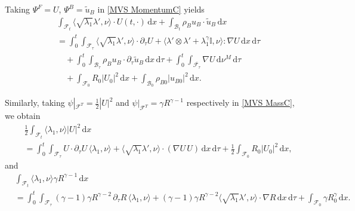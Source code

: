 \documentclass[11pt,twoside,reqno]{amsart}
\numberwithin{equation}{section}
\numberwithin{figure}{section}
\begin{document}
Taking \(\Psi^F=U\), \(\Psi^B=\tilde u_B\) in \eqref{MVS MomentumC} yields
\begin{equation}\label{testby U}
\begin{aligned}
&\int_{\mathcal{F}_t}\Big\langle\sqrt{\lambda_1}\lambda',\nu\Big\rangle\!\cdot U(t,\cdot)\,\mathrm{d}x
+\int_{\mathcal{B}_t}\rho_B u_B\cdot \tilde u_B\,\mathrm{d}x
\\&=\int_0^t\!\!\int_{\mathcal{F}_\tau}
  \Big\langle\sqrt{\lambda_1}\lambda',\nu\Big\rangle\!\cdot \partial_\tau U
 +\Big\langle\lambda'\!\otimes\!\lambda'+\lambda_1^\gamma \mathbb{I},\nu\Big\rangle\!:\!\nabla U\,\mathrm{d}x\,\mathrm{d}\tau\\
&\quad+\int_0^t\!\!\int_{\mathcal{B}_\tau}\rho_B u_B\cdot \partial_\tau \tilde u_B\,\mathrm{d}x\,\mathrm{d}\tau
+\int_0^t\!\!\int_{\overline{\mathcal{F}_\tau}}\nabla U\,\mathrm{d}\nu^M\,\mathrm{d}\tau\\
&\quad+\int_{\mathcal{F}_0}R_0|U_0|^2\,\mathrm{d}x
+\int_{\mathcal{B}_0}\rho_{B0}|u_{B0}|^2\,\mathrm{d}x.
\end{aligned}
\end{equation}

Similarly, taking \(\psi|_{\mathcal{F}^T}=\frac{1}{2}|U|^2\) and \(\psi|_{\mathcal{F}^T}=\gamma R^{\gamma-1}\) respectively in \eqref{MVS MassC}, we obtain
\begin{equation}\label{textby UU}
\begin{aligned}
&\frac{1}{2}\int_{\mathcal{F}_t}\langle \lambda_1,\nu\rangle |U|^2\,\mathrm{d}x
\\&=\int_0^t\!\!\int_{\mathcal{F}_\tau}
 U\cdot \partial_\tau U\,\langle \lambda_1,\nu\rangle
 +\Big\langle \sqrt{\lambda_1}\lambda',\nu\Big\rangle\!\cdot(\nabla U\,U)\,\mathrm{d}x\,\mathrm{d}\tau
 +\frac{1}{2}\int_{\mathcal{F}_0}R_0|U_0|^2\,\mathrm{d}x,
\end{aligned}
\end{equation}
and
\begin{equation}\label{testby R power}
\begin{aligned}
&\int_{\mathcal{F}_t}\langle \lambda_1,\nu\rangle \gamma R^{\gamma-1}\,\mathrm{d}x
\\&=\int_0^t\!\!\int_{\mathcal{F}_\tau}
 (\gamma-1)\gamma R^{\gamma-2}\,\partial_\tau R\,\langle \lambda_1,\nu\rangle
 +(\gamma-1)\gamma R^{\gamma-2}\Big\langle \sqrt{\lambda_1}\lambda',\nu\Big\rangle\!\cdot\nabla R\,\mathrm{d}x\,\mathrm{d}\tau+\int_{\mathcal{F}_0}\gamma R_0^\gamma\,\mathrm{d}x.
\end{aligned}
\end{equation}
\end{document}
